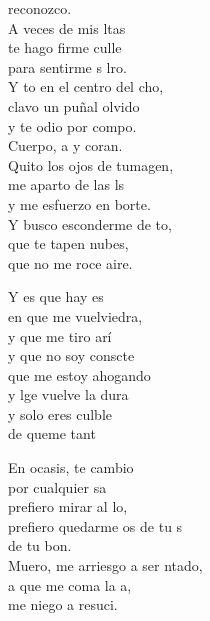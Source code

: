 \begin{cancion}[Culpable][Ixcís]%
	reconozco. \\
	A veces de mis ltas \\
	te hago firme culle \\
	para sentirme s lro. \\
	Y to en el centro del cho,\\
	clavo un puñal olvido \\
	y te odio por compo. \\
	Cuerpo, a y coran. \\
	Quito los ojos de tumagen, \\
	me aparto de las ls \\
	y me esfuerzo en borte. \\
	Y busco esconderme de to,  \\
	que te tapen  nubes,  \\
	que no me roce aire. \\
	\begin{chorus}%
	Y es que hay es \\
	en que me vuelviedra, \\
	y que me tiro arí\\
	y que no soy conscte \\
que me estoy ahogando \\
	y lge vuelve la dura \\
	y solo eres culble \\
	de queme tant\\
	\end{chorus}%
	En ocasis, te cambio\\
	por cualquier sa\\
	prefiero mirar al lo, \\
	prefiero quedarme os de tu s \\
	de tu bon. \\
	Muero, me arriesgo a ser ntado, \\
	a que me coma la a, \\
	me niego a resuci.  \\
\end{cancion}%
